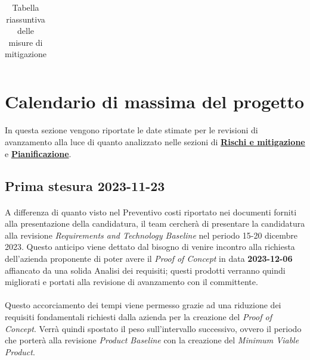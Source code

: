 \documentclass[10pt, a4paper]{article}
\begin{document}
{{{{{{\begin{table}[H]
\begin{tabularx}{\textwidth}{c|c|c|X}
\end{tabularx}
\caption{Tabella riassuntiva delle misure di mitigazione}
\end{table}

\newpage

\section{Calendario di massima del progetto}
\paragraph{}In questa sezione vengono riportate le date stimate per le revisioni di avanzamento alla luce di quanto analizzato nelle sezioni di \hyperref[section:Rischi]{\textbf{Rischi e mitigazione}} e \hyperref[section:Pianificazione]{\textbf{Pianificazione}}.

\subsection{Prima stesura 2023-11-23}
\paragraph{}A differenza di quanto visto nel Preventivo costi riportato nei documenti forniti alla presentazione della candidatura, il team cercherà di presentare la candidatura alla revisione \textit{Requirements and Technology Baseline} nel periodo 15-20 dicembre 2023. Questo anticipo viene dettato dal bisogno di venire incontro alla richiesta dell'azienda proponente di poter avere il \textit{Proof of Concept} in data \textbf{2023-12-06} affiancato da una solida Analisi dei requisiti; questi prodotti verranno quindi migliorati e portati alla revisione di avanzamento con il committente.
\paragraph{} Questo accorciamento dei tempi viene permesso grazie ad una riduzione dei requisiti fondamentali richiesti dalla azienda per la creazione del \textit{Proof of Concept}. Verrà quindi spostato il peso sull'intervallo successivo, ovvero il periodo che porterà alla revisione \textit{Product Baseline} con la creazione del \textit{Minimum Viable Product}.

}}}}}}
\end{document}
